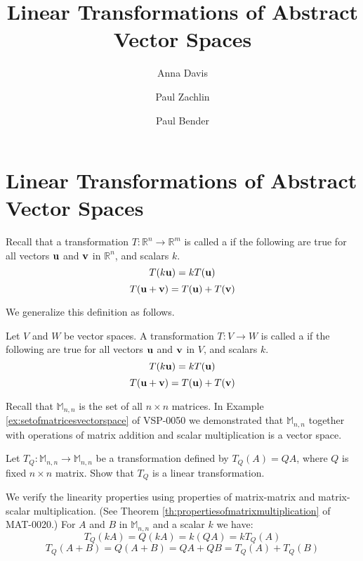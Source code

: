 \documentclass{ximera}
\author{Anna Davis \and Paul Zachlin \and Paul Bender} \title{Linear Transformations of Abstract Vector Spaces} \license{CC-BY 4.0}
\begin{document}
\begin{abstract}
\end{abstract}
\maketitle

\section*{Linear Transformations of Abstract Vector Spaces}

Recall that a transformation $T:\mathbb{R}^n\rightarrow \mathbb{R}^m$ is called a  if the following are true for all vectors ${\bf u}$ and ${\bf v}$ in $\mathbb{R}^n$, and scalars $k$.
\begin{equation*}
T(k{\bf u})= kT({\bf u})
\end{equation*}
\begin{equation*}
T({\bf u}+{\bf v})= T({\bf u})+T({\bf v})
\end{equation*}

We generalize this definition as follows.

\begin{definition}\label{def:lintransgeneral}
Let $V$ and $W$ be vector spaces. A transformation $T:V\rightarrow W$ is called a  if the following are true for all vectors ${\bf u}$ and ${\bf v}$ in $V$, and scalars $k$.
\begin{equation*}
T(k{\bf u})= kT({\bf u})
\end{equation*}
\begin{equation*}
T({\bf u}+{\bf v})= T({\bf u})+T({\bf v})
\end{equation*}
\end{definition}

\begin{example}\label{ex:abstvectsplintransM22}
Recall that $\mathbb{M}_{n,n}$ is the set of all $n\times n$ matrices.  In Example \ref{ex:setofmatricesvectorspace} of VSP-0050 we demonstrated that $\mathbb{M}_{n,n}$ together with operations of matrix addition and scalar multiplication is a vector space.

Let $T_Q:\mathbb{M}_{n,n}\rightarrow \mathbb{M}_{n,n}$ be a transformation defined by $T_Q(A)=QA$, where $Q$ is fixed $n\times n$ matrix.  Show that $T_Q$ is a linear transformation.
\begin{explanation}
We verify the linearity properties using properties of matrix-matrix and matrix-scalar multiplication.  (See Theorem \ref{th:propertiesofmatrixmultiplication} of MAT-0020.)  For $A$ and $B$ in $\mathbb{M}_{n,n}$ and a scalar $k$ we have:
$$T_Q(kA)=Q(kA)=k(QA)=kT_Q(A)$$
$$T_Q(A+B)=Q(A+B)=QA+QB=T_Q(A)+T_Q(B)$$
\end{explanation}
\end{example}
\end{document}

